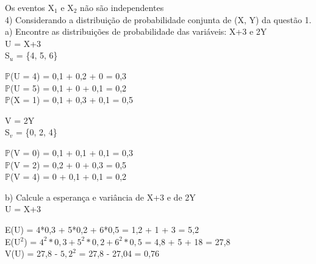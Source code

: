 \documentclass[12pt,a4paper,draft,final,oneside]{article}
\begin{document}
	\vspace{0.5cm}
	Os eventos X$_{1}$ e X$_{2}$ não são independentes
	\vspace{1cm}\\
	4) Considerando a distribuição de probabilidade conjunta de (X, Y) da questão 1.\\
	a) Encontre as distribuições de probabilidade das variáveis: X+3 e 2Y
	\vspace{0.5cm}\\
	U = X+3
	\vspace{0.5cm}\\
	S$_{u}$ = \{4, 5, 6\}
	\begin{center}
		\vspace{0.5cm}
		$\mathbb{P}$(U = 4) = 0,1 + 0,2 + 0 = 0,3 
		\vspace{0.5cm}\\
		$\mathbb{P}$(U = 5) = 0,1 + 0 + 0,1 = 0,2 
		\vspace{0.5cm}\\
		$\mathbb{P}$(X = 1) = 0,1 + 0,3 + 0,1 = 0,5 
	\end{center}
	\vspace{1cm}
	V = 2Y
	\vspace{0.5cm}\\
	S$_{v}$ = \{0, 2, 4\}
	\begin{center}
		\vspace{0.5cm}
		$\mathbb{P}$(V = 0) = 0,1 + 0,1 + 0,1 = 0,3 
		\vspace{0.5cm}\\
		$\mathbb{P}$(V = 2) = 0,2 + 0 + 0,3 = 0,5 
		\vspace{0.5cm}\\
		$\mathbb{P}$(V = 4) = 0 + 0,1 + 0,1 = 0,2 
	\end{center}
	\vspace{1cm}
	b) Calcule a esperança e variância de X+3 e de 2Y
	\vspace{0.5cm}\\
	U = X+3
	\begin{center}
		\vspace{0.5cm}
		E(U) = 4*0,3 + 5*0,2 + 6*0,5 = 1,2 + 1 + 3 = 5,2
		\vspace{0.5cm}\\
		E(U$^2$) = $4^2*0,3 + 5^2*0,2 + 6^2*0,5$ = 4,8 + 5 + 18 = 27,8
		\vspace{0.5cm}\\
		V(U) = 27,8 - $5,2^2$ = 27,8 - 27,04 = 0,76
	\end{center}
	\vspace{1cm}
\end{document}
